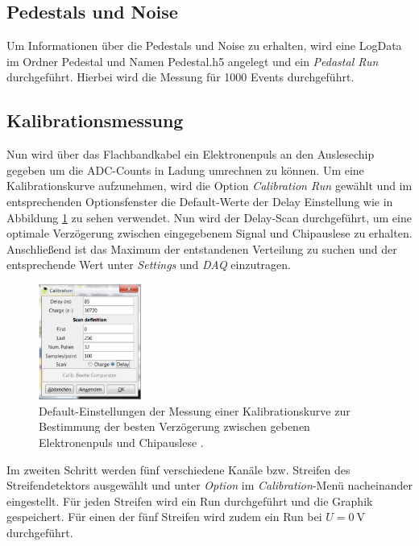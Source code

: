 \subsection{Pedestals und Noise}
\label{sec:Auswertung_Noise}
Um Informationen über die Pedestals und Noise zu erhalten, wird eine LogData im
Ordner Pedestal und Namen Pedestal.h5 angelegt und ein \textit{Pedastal Run}
durchgeführt. Hierbei wird die Messung für 1000 Events durchgeführt.

\subsection{Kalibrationsmessung}
\label{sec:Kalibrationsmessung}
Nun wird über das Flachbandkabel ein Elektronenpuls an den Auslesechip gegeben
um die ADC-Counts in Ladung umrechnen zu können. Um eine Kalibrationskurve
aufzunehmen, wird die Option \textit{Calibration Run} gewählt und im entsprechenden
Optionsfenster die Default-Werte der Delay Einstellung wie in Abbildung
\ref{fig:calibration-durchfuehrung} zu sehen verwendet. Nun wird der Delay-Scan durchgeführt,
um eine optimale Verzögerung zwischen eingegebenem Signal und Chipauslese zu
erhalten. Anschließend ist das Maximum der entstandenen Verteilung zu suchen und
der entsprechende Wert unter \textit{Settings} und \textit{DAQ} einzutragen.
\begin{figure}[htb]
  \centering
  \includegraphics[width=0.3\textwidth]{images/Calibration.png}
  \caption{Default-Einstellungen der Messung einer Kalibrationskurve zur Bestimmung
  der besten Verzögerung zwischen gebenen Elektronenpuls und Chipauslese \cite{anleitung}.}
  \label{fig:calibration-durchfuehrung}
\end{figure}

Im zweiten Schritt werden fünf verschiedene Kanäle bzw. Streifen des Streifendetektors
ausgewählt und unter \textit{Option} im \textit{Calibration}-Menü nacheinander
eingestellt. Für jeden Streifen wird ein Run durchgeführt und die Graphik gespeichert.
Für einen der fünf Streifen wird zudem ein Run bei $U=\SI{0}{\volt}$ durchgeführt.

